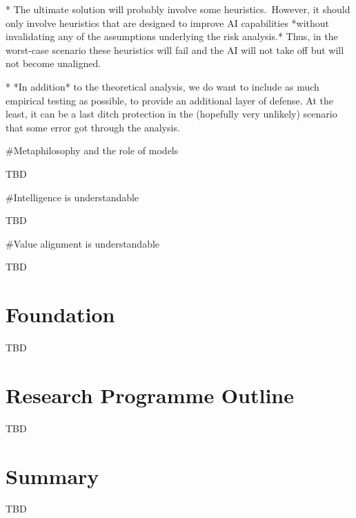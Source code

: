 \documentclass[a4paper]{article}
\begin{document}
* The ultimate solution will probably involve some heuristics.\ However, it should only involve heuristics that are designed to improve AI capabilities *without invalidating any of the assumptions underlying the risk analysis.* Thus, in the worst-case scenario these heuristics will fail and the AI will not take off but will not become unaligned.

* *In addition* to the theoretical analysis, we do want to include as much empirical testing as possible, to provide an additional layer of defense. At the least, it can be a last ditch protection in the (hopefully very unlikely) scenario that some error got through the analysis.

\#Metaphilosophy and the role of models

TBD

\#Intelligence is understandable

TBD

\#Value alignment is understandable

TBD

\section{Foundation}


TBD

\section{Research Programme Outline}


TBD

\section{Summary}


TBD
\end{document}
